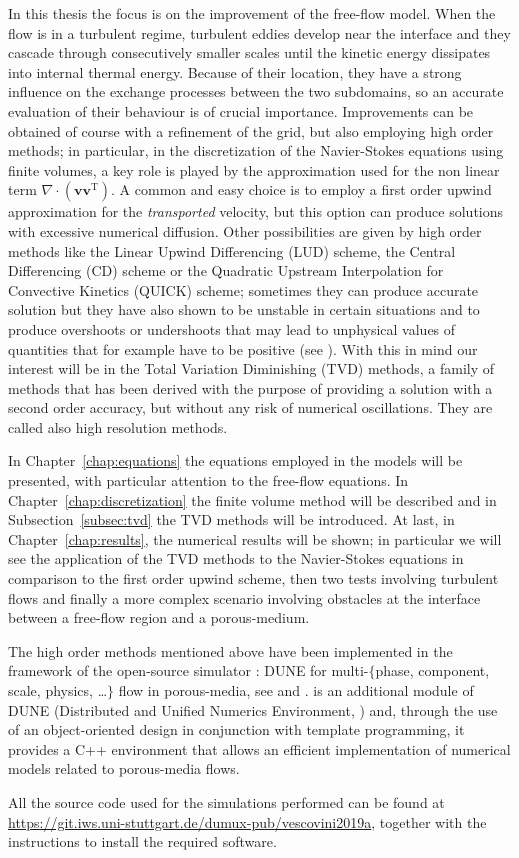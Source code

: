 In this thesis the focus is on the improvement of the free-flow model. When the 
flow is in a turbulent regime, turbulent eddies develop near the interface and 
they cascade through consecutively smaller scales until the kinetic energy 
dissipates into internal thermal energy. Because of their location, they have 
a strong influence on the exchange processes between the two subdomains, so an 
accurate evaluation of their behaviour is of crucial importance. Improvements 
can be obtained of course with a refinement of the grid, but also employing 
high order methods; in 
particular, in the discretization of the Navier-Stokes equations using finite 
volumes, a key role is played by the approximation used for the non linear term 
$\nabla \cdot (\mathbf{v} \mathbf{v}^\mathrm{T})$. A common and easy 
choice is to employ a first order upwind approximation for the 
\emph{transported} velocity, but this option can produce solutions with 
excessive numerical diffusion. Other possibilities are given by high order 
methods 
like the Linear Upwind Differencing (LUD) scheme, the Central Differencing (CD) 
scheme or the Quadratic Upstream Interpolation for Convective Kinetics (QUICK) 
scheme; sometimes they can produce 
accurate solution but they have also shown to be unstable in certain 
situations and to produce overshoots or undershoots that 
may lead to unphysical values of quantities that for example have to be 
positive (see \cite{main:vermal}). With this in mind our interest will be in 
the Total Variation Diminishing (TVD) methods, a family of methods that has 
been derived with the purpose of providing a solution with a second order 
accuracy, but without any risk of numerical oscillations. They are called also 
high resolution methods.

In Chapter~\ref{chap:equations} the equations employed in the models will be 
presented, with particular attention to the free-flow equations. In 
Chapter~\ref{chap:discretization} the finite volume method will be described 
and in Subsection~\ref{subsec:tvd} the TVD methods will be introduced. At last, 
in Chapter~\ref{chap:results}, the numerical results will be shown; in 
particular we will see the application of the TVD methods to the Navier-Stokes 
equations in comparison to the first order upwind scheme, then two tests 
involving turbulent flows and finally a more complex scenario involving 
obstacles at the interface between a free-flow region and a porous-medium.

The high order methods mentioned above have been implemented in the framework 
of the open-source simulator \DUMUX: DUNE for multi-$\{$phase, component, 
scale, physics, \dots$\}$ flow in porous-media, see \cite{dumux:tutti} and 
\cite{dumux:flemisch}. \DUMUX is an 
additional module of DUNE (Distributed and Unified Numerics Environment, 
\cite{web:dune}) and, through the use of an object-oriented design in 
conjunction with template programming, it provides a C++ environment that 
allows an efficient implementation of numerical models related to porous-media 
flows.

All the source code used for the simulations performed can be 
found at \url{https://git.iws.uni-stuttgart.de/dumux-pub/vescovini2019a}, 
together with the instructions to install the required software.